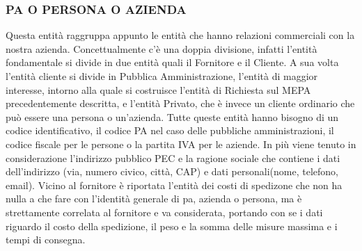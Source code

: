 \subsubsection{PA O PERSONA O AZIENDA}
Questa entità raggruppa appunto le entità che hanno relazioni commerciali con la nostra azienda. Concettualmente c'è una doppia divisione, infatti l'entità fondamentale si divide in due entità quali il Fornitore e il Cliente. A sua volta l'entità cliente si divide in Pubblica Amministrazione, l'entità di maggior interesse, intorno alla quale si costruisce l'entità di Richiesta sul MEPA precedentemente descritta, e l'entità Privato, che è invece un cliente ordinario che può essere una persona o un'azienda.\newline
Tutte queste entità hanno bisogno di un codice identificativo, il codice PA nel caso delle pubbliche amministrazioni, il codice fiscale per le persone o la partita IVA per le aziende. In più viene tenuto in considerazione l'indirizzo pubblico PEC e la ragione sociale che contiene i dati dell'indirizzo (via, numero civico, città, CAP) e dati personali(nome, telefono, email).\newline
Vicino al fornitore è riportata l'entità dei costi di spedizone che non ha nulla a che fare con l'identità generale di pa, azienda o persona, ma è strettamente correlata al fornitore e va considerata, portando con se i dati riguardo il costo della spedizione, il peso e la somma delle misure massima e i tempi di consegna.
\newline\newline
\noindent{}

